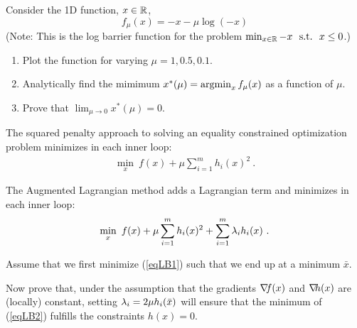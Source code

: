 

\renewcommand{\course}{Optimization Algorithms}
\renewcommand{\coursepicture}{optim}
\renewcommand{\coursedate}{Winter 2024/25}
\renewcommand{\exnum}{Weekly Exercise 4}

\exercises


\exercisestitle



Consider the 1D function, $x\in{\mathbb{R}}$,
$$f_\mu(x) = -x - \mu\log(-x)$$
(Note: This is the log barrier function for the problem $\min_{x\in{\mathbb{R}}} -x ~~\text{s.t.}~~ x \le 0$.)

\begin{enumerate}
	\item Plot the function for varying $\mu=1,0.5,0.1$.
	
	\item Analytically find the mimimum $x^*(\mu) = \operatorname*{argmin}_x f_\mu(x)$ as a function of $\mu$.
	
	\item Prove that $\lim_{\mu\to 0} x^*(\mu) = 0$.
\end{enumerate}



The squared penalty approach to solving an equality constrained optimization problem minimizes in each inner loop:
\begin{align}
\min_x~ f(x) + \mu \sum_{i=1}^m h_i(x)^2 ~. \label{eqLB1}
\end{align}

The Augmented Lagrangian method adds a Lagrangian term and minimizes in each inner loop:
\begin{align}
\min_x~ f(x) + \mu \sum_{i=1}^m h_i(x)^2 + \sum_{i=1}^m \lambda_i h_i(x)
~.\label{eqLB2}
\end{align}

Assume that we first minimize (\ref{eqLB1}) such that we end up at a minimum $\bar{x}$.

Now prove that, under the assumption
that the gradients ${\nabla_{\!\!}} f(x)$ and ${\nabla_{\!\!}} h(x)$ are (locally) constant, setting $\lambda_i = 2\mu h_i(\bar{x})$ will ensure that the minimum of (\ref{eqLB2}) fulfills the constraints
$h(x)=0$.


